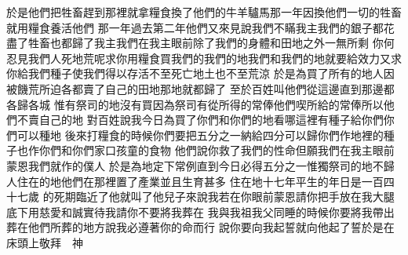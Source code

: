 於是他們把牲畜趕到那裡\chientien{}就拿糧食換了他們的牛\chientien 羊\chientien 驢\chientien 馬\chientien 那一年因換他們一切的牲畜\chientien 就用糧食養活他們\chuan 
{}那一年過去\chientien 第二年他們又來見說\chientien 我們不瞞我主\chientien 我們的銀子都花盡了\chientien 牲畜也都歸了我主\chientien 我們在我主眼前除了我們的身體和田地之外\chientien 一無所剩\chuan 
{}你何忍見我們人死地荒呢\yuentien 求你用糧食買我們的我們的地\chientien 我們和我們的地就要給效力\yuentien 又求你給我們種子\chientien 使我們得以存活\chientien 不至死亡\chientien 地土也不至荒涼\chuan 
{}於是為買了所有的地\chientien{}人因被饑荒所迫\chientien 各都賣了自己的田地\yuentien 那地就都歸了\chuan 
{}至於百姓\chientien{}叫他們從這邊\chientien 直到那邊\chientien 都各歸各城\chuan 
{}惟有祭司的地\chientien{}沒有買\chientien 因為祭司有從所得的常俸\chientien 他們喫所給的常俸\chientien 所以他們不賣自己的地\chuan 
{}對百姓說\chientien 我今日為買了你們\chientien 和你們的地\chientien 看哪\chientien 這裡有種子給你們\chientien 你們可以種地\chuan 
{}後來打糧食的時候\chientien 你們要把五分之一納給\chientien 四分可以歸你們作地裡的種子\chientien 也作你們和你們家口孩童的食物\chuan 
{}他們說\chientien 你救了我們的性命\chientien 但願我們在我主眼前蒙恩\chientien 我們就作的僕人\chuan 
{}於是為地定下常例直到今日\chientien{}必得五分之一\chientien 惟獨祭司的地不歸\chuan\Chuan
{}人住在的地\chientien 他們在那裡置了產業\chientien 並且生育甚多\chuan 
{}住在地十七年\chientien{}平生的年日是一百四十七歲\chuan 
{}的死期臨近了\chientien 他就叫了他兒子來\chientien 說\chientien 我若在你眼前蒙恩\chientien 請你把手放在我大腿底下\chientien 用慈愛和誠實待我\chientien 請你不要將我葬在\yuentien 
{}我與我祖我父同睡的時候\chientien 你要將我帶出\chientien 葬在他們所葬的地方\chuan{}說\chientien 我必遵著你的命而行\chuan 
{}說\chientien 你要向我起誓\chientien{}就向他起了誓\chientien 於是在床頭上敬拜　神\chuan 
